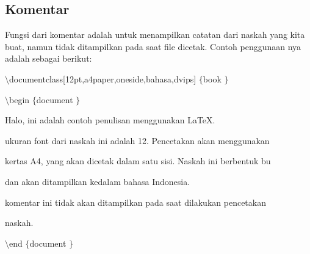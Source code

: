 \subsection{Komentar}
 \par
\hspace{0.50in} Fungsi dari komentar adalah untuk menampilkan catatan dari naskah yang kita buat, namun tidak ditampilkan pada saat file dicetak. Contoh penggunaan nya adalah sebagai berikut:
 \par
{\fontsize{10pt}{10pt}\selectfont  $  \setminus  $documentclass[12pt,a4paper,oneside,bahasa,dvips] $  \{  $book $  \}  $}
 \par
{\fontsize{10pt}{10pt}\selectfont  $  \setminus  $begin $  \{  $document $  \}  $}
 \par
{\fontsize{10pt}{10pt}\selectfont Halo, ini adalah contoh penulisan menggunakan LaTeX.}
 \par
{\fontsize{10pt}{10pt}\selectfont ukuran font dari naskah ini adalah 12. Pencetakan akan menggunakan}
 \par
{\fontsize{10pt}{10pt}\selectfont kertas A4, yang akan dicetak dalam satu sisi. Naskah ini berbentuk bu}
 \par
{\fontsize{10pt}{10pt}\selectfont dan akan ditampilkan kedalam bahasa Indonesia.}
 \par
{\fontsize{10pt}{10pt}\selectfont komentar ini tidak akan ditampilkan pada saat dilakukan pencetakan}
 \par
{\fontsize{10pt}{10pt}\selectfont naskah.}
 \par
{\fontsize{10pt}{10pt}\selectfont  $  \setminus  $end $  \{  $document $  \}  $}
 \par
